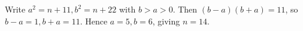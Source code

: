 Write $a^2=n+11,b^2=n+22$ with $b>a>0$. Then $(b-a)(b+a)=11$, so $b-a=1,b+a=11$. Hence $a=5,b=6$, giving $\boxed{n=14}$.
